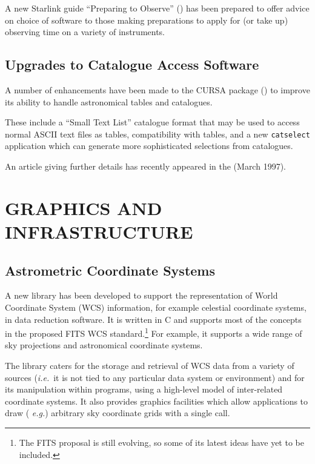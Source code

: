 A new Starlink guide ``Preparing to Observe'' ()
has been prepared to offer advice on choice of software to those
making preparations to apply for (or take up) observing time on a
variety of instruments.

\subsection{Upgrades to Catalogue Access Software}

A number of enhancements have been made to the CURSA package
() to improve its ability to handle
astronomical tables and catalogues.

These include a ``Small Text List'' catalogue format that may be used
to access normal ASCII text files as tables, compatibility with
 tables, and a new {\tt catselect} application
which can generate more sophisticated selections from catalogues.

An article giving further details has recently appeared in the
 (March
1997).

\section{GRAPHICS AND INFRASTRUCTURE}

\subsection{\label{infra:astrom}Astrometric Coordinate Systems}

A new library has been developed to support the representation of
World Coordinate System (WCS) information, for example celestial
coordinate systems, in data reduction software. It is written in C and
supports most of the concepts in the proposed FITS WCS
standard.\footnote{The FITS proposal is still evolving, so some of its
latest ideas have yet to be included.} For example, it supports a wide
range of sky projections and astronomical coordinate systems.

The library caters for the storage and retrieval of WCS data from a
variety of sources ({\em i.e.}\ it is not tied to any particular data
system or environment) and for its manipulation within programs, using
a high-level model of inter-related coordinate systems. It also
provides graphics facilities which allow applications to draw ({\em
e.g.}) arbitrary sky coordinate grids with a single call.

